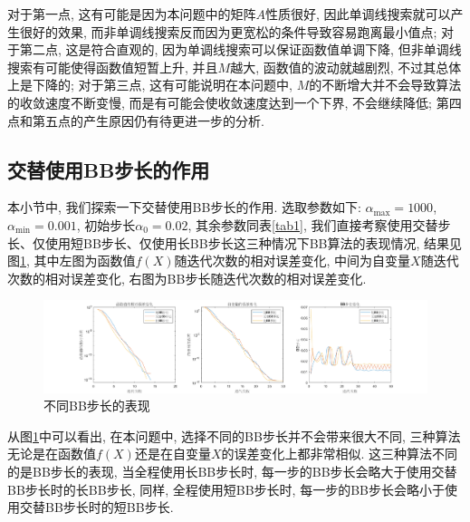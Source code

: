 \documentclass[UTF8]{ctexart}
\begin{document}
对于第一点, 这有可能是因为本问题中的矩阵$A$性质很好, 因此单调线搜索就可以产生很好的效果, 而非单调线搜索反而因为更宽松的条件导致容易跑离最小值点; 对于第二点, 这是符合直观的, 因为单调线搜索可以保证函数值单调下降, 但非单调线搜索有可能使得函数值短暂上升, 并且$M$越大, 函数值的波动就越剧烈, 不过其总体上是下降的; 对于第三点, 这有可能说明在本问题中, $M$的不断增大并不会导致算法的收敛速度不断变慢, 而是有可能会使收敛速度达到一个下界, 不会继续降低; 第四点和第五点的产生原因仍有待更进一步的分析. 

\subsection{交替使用BB步长的作用}
本小节中, 我们探索一下交替使用BB步长的作用. 选取参数如下: $\alpha_{\max}=1000$, $\alpha_{\min}=0.001$, 初始步长$\alpha_0=0.02$, 其余参数同表\ref{tab1}, 我们直接考察使用交替步长、仅使用短BB步长、仅使用长BB步长这三种情况下BB算法的表现情况, 结果见图\ref{fig7}, 其中左图为函数值$f(X)$随迭代次数的相对误差变化, 中间为自变量$X$随迭代次数的相对误差变化, 右图为BB步长随迭代次数的相对误差变化. 

\begin{figure}[htb]
    \centering
    \includegraphics[width=\textwidth]{Q2-figure/7.png}
    \caption{不同BB步长的表现}\label{fig7}
\end{figure}

从图\ref{fig7}中可以看出, 在本问题中, 选择不同的BB步长并不会带来很大不同, 三种算法无论是在函数值$f(X)$还是在自变量$X$的误差变化上都非常相似. 这三种算法不同的是BB步长的表现, 当全程使用长BB步长时, 每一步的BB步长会略大于使用交替BB步长时的长BB步长, 同样, 全程使用短BB步长时, 每一步的BB步长会略小于使用交替BB步长时的短BB步长. 
\end{document}
